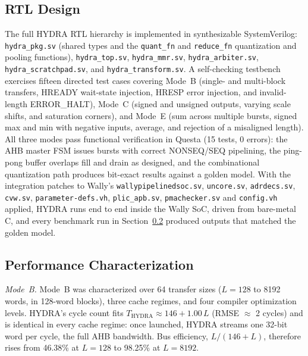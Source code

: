 \documentclass[conference]{IEEEtran}
\begin{document}
    \subsection{RTL Design}
        The full HYDRA RTL hierarchy is implemented in synthesizable 
        SystemVerilog: \texttt{hydra\_pkg.sv} (shared types and the 
        \texttt{quant\_fn} and \texttt{reduce\_fn} quantization and pooling functions), \texttt{hydra\_top.sv}, 
        \texttt{hydra\_mmr.sv}, \texttt{hydra\_arbiter.sv}, 
        \texttt{hydra\_scratchpad.sv}, and \texttt{hydra\_transform.sv}. A 
        self-checking testbench exercises fifteen directed test cases covering 
        Mode~B (single- and multi-block transfers, HREADY wait-state injection, 
        HRESP error injection, and invalid-length ERROR\_HALT), Mode~C 
        (signed and unsigned outputs, varying scale shifts, and saturation
        corners), and Mode~E (sum across multiple bursts,
        signed max and min with negative inputs, average, and rejection of a
        misaligned length). All three modes pass functional verification in
        Questa (15 tests, 0 errors): the AHB
        master FSM issues bursts with correct NONSEQ/SEQ pipelining, 
        the ping-pong buffer overlaps fill and drain as designed, and the 
        combinational quantization path produces bit-exact results against a 
        golden model. With the integration patches to Wally's
        \texttt{wallypipelinedsoc.sv}, \texttt{uncore.sv},
        \texttt{adrdecs.sv}, \texttt{cvw.sv}, \texttt{parameter-defs.vh}, 
        \texttt{plic\_apb.sv}, \texttt{pmachecker.sv} and \texttt{config.vh}
        applied, HYDRA runs end to end inside the Wally SoC, driven from 
        bare-metal C, and every benchmark run in Section~\ref{sec:perf} 
        produced outputs that matched the golden model.
    \subsection{Performance Characterization}
    \label{sec:perf}
        \textit{Mode~B.} Mode~B was characterized over 64 transfer sizes
        ($L = 128$ to 8192 words, in 128-word blocks), three cache regimes,
        and four compiler optimization levels. HYDRA's cycle count fits
        $T_{\text{HYDRA}} \approx 146 + 1.00\,L$ (RMSE $\approx$ 2 cycles)
        and is identical in every cache regime: once launched, HYDRA
        streams one 32-bit word per cycle, the full AHB bandwidth. Bus
        efficiency, $L/(146+L)$, therefore rises from 46.38\% at
        $L = 128$ to 98.25\% at $L = 8192$.
\end{document}
